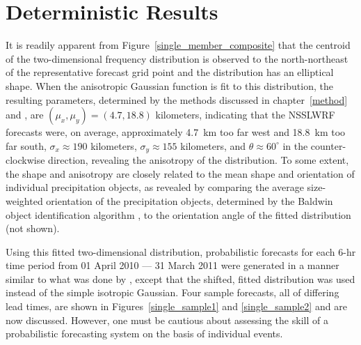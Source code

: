 

\section{Deterministic Results}
\label{dresults}

It is readily apparent from \mbox{Figure \ref{single_member_composite}} that the centroid of the two-dimensional frequency distribution is observed to the north-northeast of the representative forecast grid point and the distribution has an elliptical shape. When the anisotropic Gaussian function is fit to this distribution, the resulting parameters, determined by the methods discussed in \mbox{chapter \ref{method}} and \cite{Lak2010}, are $(\mu_x, \mu_y) = (4.7, 18.8)$ kilometers, indicating that the NSSLWRF forecasts were, on average, approximately \mbox{4.7 km} too far west and \mbox{18.8 km} too far south, $\sigma_x \approx 190$ kilometers, $\sigma_y \approx 155$ kilometers, and $\theta \approx 60^{\circ}$ in the counter-clockwise direction, revealing the anisotropy of the distribution. To some extent, the shape and anisotropy are closely related to the mean shape and orientation of individual precipitation objects, as revealed by comparing the average size-weighted orientation of the precipitation objects, determined by the Baldwin object identification algorithm \citep{Baldwin2005}, to the orientation angle of the fitted distribution (not shown).

Using this fitted two-dimensional distribution, probabilistic forecasts for each \mbox{6-hr} time period from 01 April 2010 --- 31 March 2011 were generated in a manner similar to what was done by \cite{Sobash2011}, except that the shifted, fitted distribution was used instead of the simple isotropic Gaussian. Four sample forecasts, all of differing lead times, are shown in \mbox{Figures \ref{single_sample1}} and \ref{single_sample2} and are now discussed. However, one must be cautious about assessing the skill of a probabilistic forecasting system on the basis of individual events.

